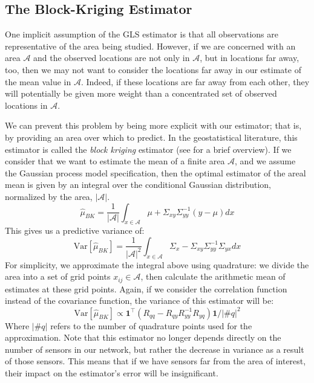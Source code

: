 \subsection{The Block-Kriging Estimator}
\label{sec:si_block_kriging}

One implicit assumption of the GLS estimator is that all observations are representative of the area being studied. However, if we are concerned with an area $\mathcal{A}$ and the observed locations are not only in $\mathcal{A}$, but in locations far away, too, then we may not want to consider the locations far away in our estimate of the mean value in $\mathcal{A}$. Indeed, if these locations are far away from each other, they will potentially be given more weight than a concentrated set of observed locations in $\mathcal{A}$.

We can prevent this problem by being more explicit with our estimator; that is, by providing an area over which to predict. In the geostatistical literature, this estimator is called the \textit{block kriging} estimator (see \textcite{wackernagel2003multivariate} for a brief overview). If we consider that we want to estimate the mean of a finite area $\mathcal{A}$, and we assume the Gaussian process model specification, then the optimal estimator of the areal mean is given by an integral over the conditional Gaussian distribution, normalized by the area, $|\mathcal{A}|$.
\begin{equation}
 \hat{\mu}_{BK} =\frac{1}{|\mathcal{A}|}\int_{x\in\mathcal{A}}\mu+\Sigma_{xy}\Sigma_{yy}^{-1}(y-\mu)dx
\end{equation}
This gives us a predictive variance of:
\begin{equation}
 \text{Var}[\hat{\mu}_{BK}] =\frac{1}{|\mathcal{A}|^2}\int_{x\in\mathcal{A}}\Sigma_x -\Sigma_{xy}\Sigma_{yy}^{-1}\Sigma_{yx}dx
\end{equation}
For simplicity, we approximate the integral above using quadrature: we divide the area into a set of grid points $x_{ij}\in \mathcal{A}$, then calculate the arithmetic mean of estimates at these grid points. Again, if we consider the correlation function instead of the covariance function, the variance of this estimator will be:
\begin{equation}
 \text{Var}[\hat{\mu}_{BK}] \propto \mathbf{1}^\top (R_{qq} - R_{qy}R_{yy}^{-1}R_{yq})\mathbf{1}/|\#q|^2
\end{equation}
Where $|\#q|$ refers to the number of quadrature points used for the approximation. Note that this estimator no longer depends directly on the number of sensors in our network, but rather the decrease in variance as a result of those sensors. This means that if we have sensors far from the area of interest, their impact on the estimator's error will be insignificant.

